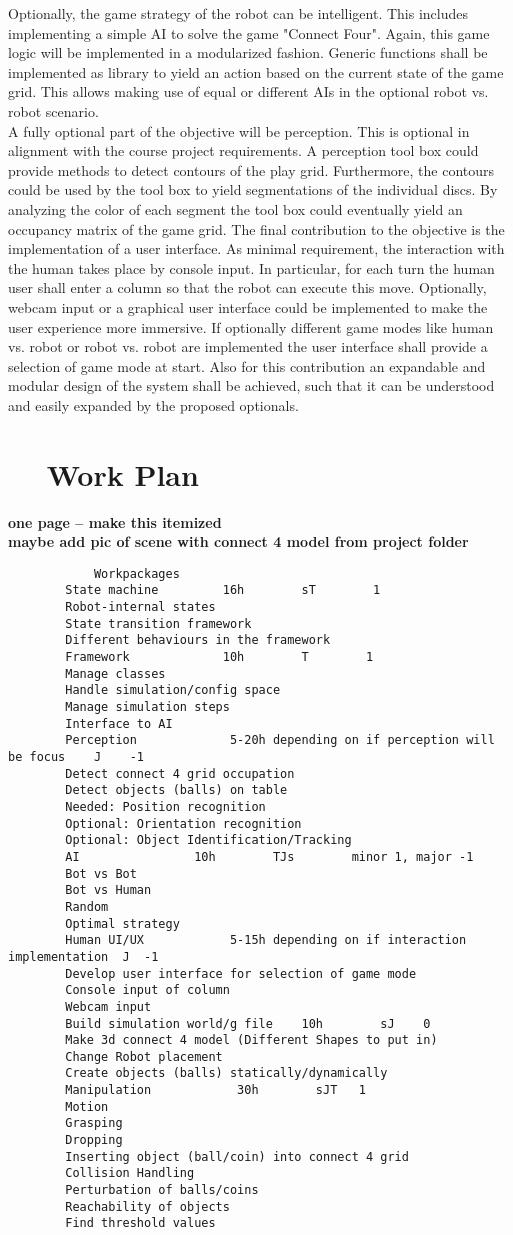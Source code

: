 \documentclass[11pt,pdftex,a4paper]{article}
\newcounter{exnum}
\newcommand{\ex}[1]{\section*{\theexnum $\quad$ #1 \stepcounter{exnum}}}
\begin{document}
	Optionally, the game strategy of the robot can be intelligent. This includes implementing a simple AI to solve the game "Connect Four".
	Again, this game logic will be implemented in a modularized fashion. Generic functions shall be implemented as library to yield an action based on the current state of the game grid. This allows making use of equal or different AIs in the optional robot vs. robot scenario.\\ 
	A fully optional part of the objective will be perception. This is optional in alignment with the course project requirements. A perception tool box could provide methods to detect contours of the play grid. Furthermore, the contours could be used by the tool box to yield segmentations of the individual discs. 
	By analyzing the color of each segment the tool box could eventually yield an occupancy matrix of the game grid.
	The final contribution to the objective is the implementation of a user interface. As minimal requirement, the interaction with the human takes place by console input. In particular, for each turn the human user shall enter a column so that the robot can execute this move. 
	Optionally, webcam input or a graphical user interface could be implemented to make the user experience more immersive. If optionally different game modes like human vs. robot or robot vs. robot are implemented the user interface shall provide a selection of game mode at start.
	Also for this contribution an expandable and modular design of the system shall be achieved, such that it can be understood and easily expanded by the proposed optionals.	\\
   
	\ex{Work Plan}
	\textbf{one page -- make this itemized}
	\\
	\textbf{maybe add pic of scene with connect 4 model from project folder}
	\begin{lstlisting}
			Workpackages
		State machine         16h        sT        1
		Robot-internal states
		State transition framework
		Different behaviours in the framework
		Framework             10h        T        1
		Manage classes 
		Handle simulation/config space
		Manage simulation steps
		Interface to AI
		Perception             5-20h depending on if perception will be focus    J    -1 
		Detect connect 4 grid occupation
		Detect objects (balls) on table
		Needed: Position recognition
		Optional: Orientation recognition
		Optional: Object Identification/Tracking
		AI                10h        TJs        minor 1, major -1
		Bot vs Bot
		Bot vs Human
		Random
		Optimal strategy
		Human UI/UX            5-15h depending on if interaction implementation  J  -1
		Develop user interface for selection of game mode
		Console input of column
		Webcam input
		Build simulation world/g file    10h        sJ    0
		Make 3d connect 4 model (Different Shapes to put in)
		Change Robot placement
		Create objects (balls) statically/dynamically
		Manipulation            30h        sJT   1
		Motion
		Grasping
		Dropping
		Inserting object (ball/coin) into connect 4 grid
		Collision Handling
		Perturbation of balls/coins
		Reachability of objects
		Find threshold values
	\end{lstlisting}

	
    
	
\end{document}

